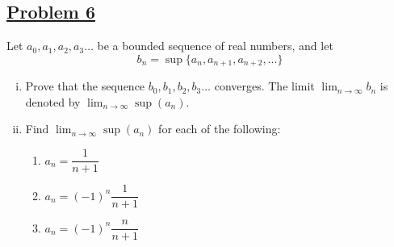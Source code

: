 \documentclass[10pt,letterpaper]{article}
\begin{document}
	\subsection*{{\color{purple}\underline{Problem 6}}}
	Let $a_0, a_1, a_2, a_3 \ldots$ be a bounded sequence of real numbers, and let
	$$b_n = \sup\{a_n, a_{n+1}, a_{n+2}, \ldots\}$$
	\begin{enumerate}[(i)]
		\item Prove that the sequence $b_0, b_1, b_2, b_3 \ldots$ converges. The limit
		$\displaystyle\lim_{n\to\infty}b_n$ is denoted by $\displaystyle\lim_{n\to\infty}\sup(a_n)$.
		\item Find $\displaystyle\lim_{n\to\infty}\sup(a_n)$ for each of the following:
		\begin{enumerate}
		\item $a_n = \dfrac{1}{n + 1}$
		\item $a_n = (-1)^n \dfrac{1}{n + 1}$
		\item $a_n = (-1)^n \dfrac{n}{n + 1}$
		\end{enumerate}			
	\end{enumerate}
\end{document}
